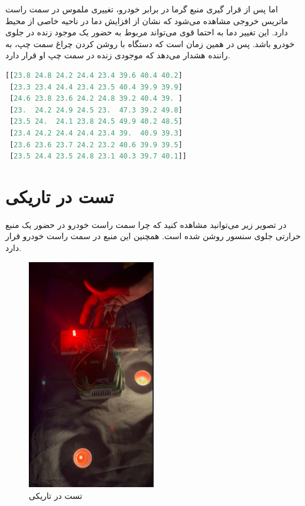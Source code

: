 اما پس از قرار گیری منبع گرما در برابر خودرو، تغییری ملموس در سمت راست ماتریس خروجی مشاهده می‌شود که نشان از افزایش دما در ناحیه خاصی از محیط دارد. این تغییر دما به احتما قوی می‌تواند مربوط به حضور یک موجود زنده در جلوی خودرو باشد. پس در همین زمان است که دستگاه با روشن کردن چراغ سمت چپ، به راننده هشدار می‌دهد که موجودی زنده در سمت چپ او قرار دارد.
\begin{latin}
\begin{lstlisting}[language=python]
[[23.8 24.8 24.2 24.4 23.4 39.6 40.4 40.2]
 [23.3 23.4 24.4 23.4 23.5 40.4 39.9 39.9]
 [24.6 23.8 23.6 24.2 24.8 39.2 40.4 39. ]
 [23.  24.2 24.9 24.5 23.  47.3 39.2 49.8]
 [23.5 24.  24.1 23.8 24.5 49.9 40.2 48.5]
 [23.4 24.2 24.4 24.4 23.4 39.  40.9 39.3]
 [23.6 23.6 23.7 24.2 23.2 40.6 39.9 39.5]
 [23.5 24.4 23.5 24.8 23.1 40.3 39.7 40.1]]
\end{lstlisting}
\end{latin}


\section{تست در تاریکی}

در تصویر زیر می‌توانید مشاهده کنید که چرا سمت راست خودرو در حضور یک منبع حرارتی جلوی سنسور روشن شده است. همچنین این منبع در سمت راست خودرو قرار دارد. 

\begin{figure}[H]
	\centering
	\includegraphics[width=0.5\textwidth]{figs/test_with_lights_off.jpg}
	\caption{تست در تاریکی}
	\label{fig:2}
\end{figure}

